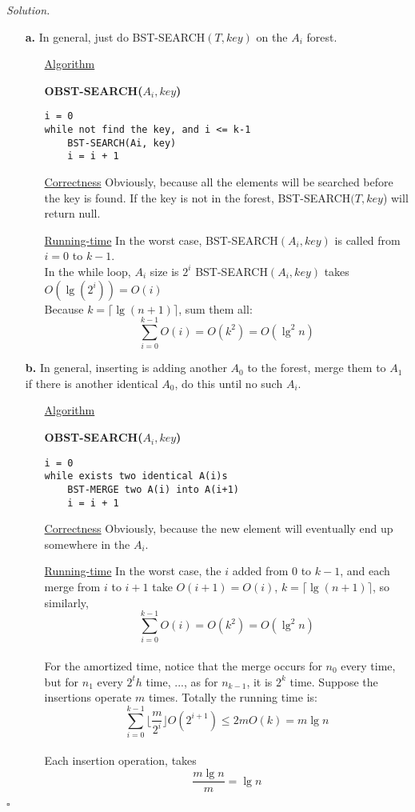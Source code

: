 \documentclass[11pt]{article}
\theoremstyle{definition}
\newenvironment{solution}{\noindent\emph{Solution.}}{\hfill$\square$}
\newcommand\tab[1][1cm]{\hspace*{#1}}
\begin{document}
\begin{solution}
\begin{enumerate}

  \item[\textbf{a.}]
  In general, just do BST-SEARCH$(T, key)$ on the $A_i$ forest.\\
 \begin{enumerate}
    \item[\underline{Algorithm}]

\textbf{OBST-SEARCH($A_i, key$)}
\begin{lstlisting}
i = 0
while not find the key, and i <= k-1
	BST-SEARCH(Ai, key)
	i = i + 1	
\end{lstlisting}

 \item[\underline{Correctness}] Obviously, because all the elements will be searched before the key is found. If the key is not in the forest, BST-SEARCH$(T, key$) will return null.\\


 \item[\underline{Running-time}]
 In the worst case, BST-SEARCH$(A_i, key)$ is called from $i = 0$ to $k-1$. \\
 In the while loop, $A_i$ size is $2^i$ BST-SEARCH$(A_i, key)$ takes $O(\lg(2^i)) = O(i)$\\
 Because $k = \lceil \lg (n+1) \rceil $, sum them all:
 $$\sum_{i=0}^{k-1}O(i) = O(k^2) = O(\lg^2 n)$$
   \end{enumerate}

  \item[\textbf{b.}]
  In general, inserting is adding another $A_0$ to the forest, merge them to $A_1$ if there is another identical $A_0$, do this until no such $A_i$.
 \begin{enumerate}
    \item[\underline{Algorithm}]

\textbf{OBST-SEARCH($A_i, key$)}
\begin{lstlisting}
i = 0
while exists two identical A(i)s
	BST-MERGE two A(i) into A(i+1)
	i = i + 1	
\end{lstlisting}

 \item[\underline{Correctness}] Obviously, because the new element will eventually end up somewhere in the $A_i$.\\


 \item[\underline{Running-time}]
 In the worst case, the $i$ added from $0$ to $k-1$, and each merge from $i$ to $i+1$ take $O(i+1) = O(i)$, $k = \lceil \lg (n+1) \rceil $, so similarly,$$\sum_{i=0}^{k-1}O(i) = O(k^2) = O(\lg^2 n)$$ \\
 \tab For the amortized time, notice that the merge occurs for $n_0$ every time, but for $n_1$ every $2^th$ time, ..., as for $n_{k-1}$, it is $2^k$ time. Suppose the insertions operate $m$ times. Totally the running time is:
 $$\sum_{i=0}^{k-1} \lfloor \frac{m}{2^i} \rfloor O(2^{i + 1}) \leq 2mO(k) = m \lg n$$\\
 \tab Each insertion operation, takes $$\frac{m \lg n}{m} = \lg n$$


\end{enumerate}
\end{enumerate}
\end{solution}
\end{document}
